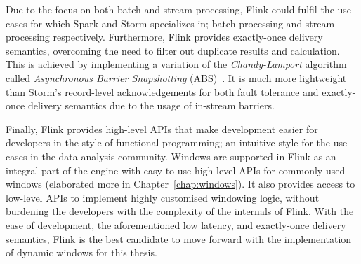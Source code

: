 Due to the focus on both batch and stream processing, Flink could fulfil the use cases for which 
Spark and Storm specializes in; batch processing and stream processing respectively. Furthermore, 
Flink provides exactly-once delivery semantics, overcoming the need to filter out duplicate 
results and calculation. This is achieved by implementing a variation of the \emph{Chandy-Lamport} algorithm
called \emph{Asynchronous Barrier Snapshotting} (ABS)~\cite{asynchronous_barrier}.
It is much more lightweight than Storm's record-level 
acknowledgements for both fault tolerance and exactly-once delivery semantics
due to the usage of in-stream barriers.  

Finally, Flink provides high-level APIs that make development easier for developers in 
the style of functional programming; an intuitive style for the use cases in the data analysis community. 
Windows are supported in Flink as an integral part of the engine with easy to use high-level APIs for 
commonly used windows (elaborated more in Chapter~\ref{chap:windows}).  
It also provides access to low-level APIs to implement highly customised windowing logic, without burdening 
the developers with the complexity of the internals of Flink. 
With the ease of development, the aforementioned low latency, and exactly-once delivery semantics, 
Flink is the best candidate to move forward with the implementation of dynamic windows for this thesis. 
